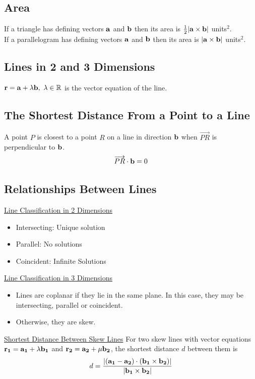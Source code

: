 \documentclass[10pt, a4paper, titlepage]{article}
\begin{document}
\begin{multicols*}{3}
	\dotfill
	\subsection{Area}
	If a triangle has defining vectors $\vb{a}$ and $\vb{b}$ then its area is $\frac{1}{2}|\vb{a}\times\vb{b}|$ units$^2$.\\
	If a parallelogram has defining vectors $\vb{a}$ and $\vb{b}$ then its area is $|\vb{a}\times\vb{b}|$ units$^2$.
	
	\dotfill
	\subsection{Lines in 2 and 3 Dimensions}
	$\vb{r}=\vb{a}+\lambda\vb{b},\ \lambda\in\mathbb{R}$ is the vector equation of the line.

	\dotfill
	\subsection{The Shortest Distance From a Point to a Line}
	A point $P$ is closest to a point $R$ on a line in direction $\vb{b}$ when $\overrightarrow{PR}$ is perpendicular to $\vb{b}$.
	\begin{align}
		\overrightarrow{PR}\cdot\vb{b}=0
	\end{align}

	\dotfill
	\subsection{Relationships Between Lines}
	\underline{Line Classification in 2 Dimensions}
	\begin{itemize}
		\item Intersecting: Unique solution
		\item Parallel: No solutions
		\item Coincident: Infinite Solutions
	\end{itemize}
	\underline{Line Classification in 3 Dimensions}
	\begin{itemize}
		\item Lines are coplanar if they lie in the same plane. In this case, they may be intersecting, parallel or coincident.
		\item Otherwise, they are skew.
	\end{itemize}
	\underline{Shortest Distance Between Skew Lines}
	For two skew lines with vector equations $\vb{r_1}=\vb{a_1}+\lambda\vb{b_1}$ and $\vb{r_2}=\vb{a_2}+\mu\vb{b_2}$, the shortest distance $d$ between them is
	\begin{align}
		d=\frac{|(\vb{a_1}-\vb{a_2})\cdot(\vb{b_1}\times\vb{b_2})|}{|\vb{b_1}\times\vb{b_2}|}
	\end{align}


\end{multicols*}
\end{document}
